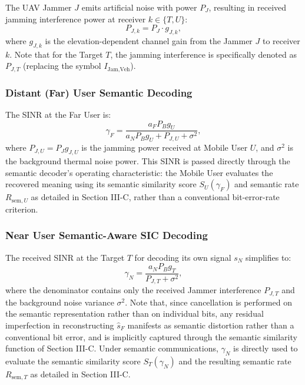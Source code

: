 \documentclass[journal,onecolumn]{IEEEtran}
\begin{document}
The UAV Jammer $J$ emits artificial noise with power $P_J$, resulting in received jamming interference power at receiver $k \in \{T, U\}$:
\begin{equation}
    P_{J, k} = P_J \cdot g_{J, k},
\end{equation}
where $g_{J, k}$ is the elevation-dependent channel gain from the Jammer $J$ to receiver $k$. Note that for the Target $T$, the jamming interference is specifically denoted as $P_{J, T}$ (replacing the symbol $I_{\text{Jam}, \text{Veh}}$).

\subsubsection{Distant (Far) User Semantic Decoding}
The SINR at the Far User is:
\begin{equation}
    \gamma_F = \frac{a_F P_B g_U}{a_N P_B g_U + P_{J, U} + \sigma^2},
\end{equation}
where $P_{J, U} = P_J g_{J, U}$ is the jamming power received at Mobile User $U$, and $\sigma^2$ is the background thermal noise power. This SINR is passed directly through the semantic decoder's operating characteristic: the Mobile User evaluates the recovered meaning using its semantic similarity score $S_U(\gamma_F)$ and semantic rate $R_{\text{sem}, U}$ as detailed in Section III-C, rather than a conventional bit-error-rate criterion.

\subsubsection{Near User Semantic-Aware SIC Decoding}
The received SINR at the Target $T$ for decoding its own signal $s_N$ simplifies to:
\begin{equation}
    \gamma_N = \frac{a_N P_B g_T}{P_{J, T} + \sigma^2},
\end{equation}
where the denominator contains only the received Jammer interference $P_{J, T}$ and the background noise variance $\sigma^2$. Note that, since cancellation is performed on the semantic representation rather than on individual bits, any residual imperfection in reconstructing $\hat{s}_F$ manifests as semantic distortion rather than a conventional bit error, and is implicitly captured through the semantic similarity function of Section III-C. Under semantic communications, $\gamma_N$ is directly used to evaluate the semantic similarity score $S_T(\gamma_N)$ and the resulting semantic rate $R_{\text{sem}, T}$ as detailed in Section III-C.
\end{document}
